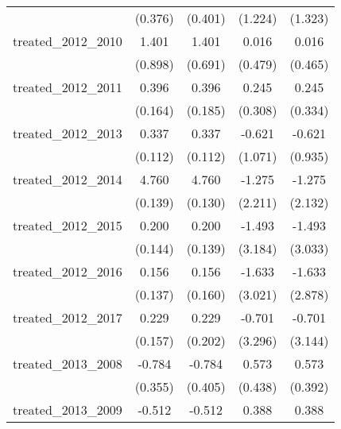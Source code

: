 {\begin{tabular}{l*{4}{c}}
            &     (0.376)         &     (0.401)         &     (1.224)         &     (1.323)         \\
[1em]
treated\_2012\_2010&       1.401         &       1.401\sym{*}  &       0.016         &       0.016         \\
            &     (0.898)         &     (0.691)         &     (0.479)         &     (0.465)         \\
[1em]
treated\_2012\_2011&       0.396\sym{*}  &       0.396\sym{*}  &       0.245         &       0.245         \\
            &     (0.164)         &     (0.185)         &     (0.308)         &     (0.334)         \\
[1em]
treated\_2012\_2013&       0.337\sym{**} &       0.337\sym{**} &      -0.621         &      -0.621         \\
            &     (0.112)         &     (0.112)         &     (1.071)         &     (0.935)         \\
[1em]
treated\_2012\_2014&       4.760\sym{***}&       4.760\sym{***}&      -1.275         &      -1.275         \\
            &     (0.139)         &     (0.130)         &     (2.211)         &     (2.132)         \\
[1em]
treated\_2012\_2015&       0.200         &       0.200         &      -1.493         &      -1.493         \\
            &     (0.144)         &     (0.139)         &     (3.184)         &     (3.033)         \\
[1em]
treated\_2012\_2016&       0.156         &       0.156         &      -1.633         &      -1.633         \\
            &     (0.137)         &     (0.160)         &     (3.021)         &     (2.878)         \\
[1em]
treated\_2012\_2017&       0.229         &       0.229         &      -0.701         &      -0.701         \\
            &     (0.157)         &     (0.202)         &     (3.296)         &     (3.144)         \\
[1em]
treated\_2013\_2008&      -0.784\sym{*}  &      -0.784         &       0.573         &       0.573         \\
            &     (0.355)         &     (0.405)         &     (0.438)         &     (0.392)         \\
[1em]
treated\_2013\_2009&      -0.512         &      -0.512         &       0.388         &       0.388         \\

\end{tabular}}
